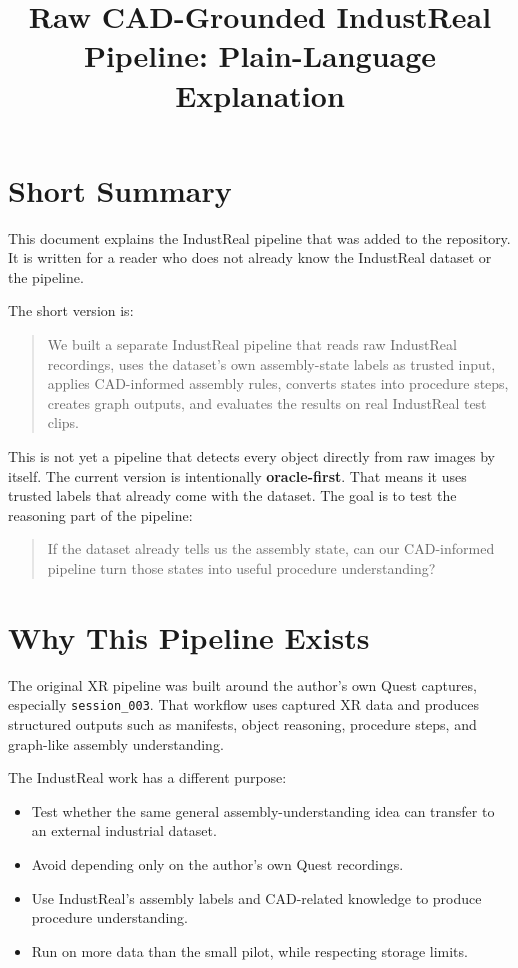 \documentclass[11pt,a4paper]{article}
\title{Raw CAD-Grounded IndustReal Pipeline: Plain-Language Explanation}
\author{}
\date{}
\begin{document}
\maketitle

\section*{Short Summary}

This document explains the IndustReal pipeline that was added to the repository. It is written for a reader who does not already know the IndustReal dataset or the pipeline.

The short version is:

\begin{quote}
We built a separate IndustReal pipeline that reads raw IndustReal recordings, uses the dataset's own assembly-state labels as trusted input, applies CAD-informed assembly rules, converts states into procedure steps, creates graph outputs, and evaluates the results on real IndustReal test clips.
\end{quote}

This is not yet a pipeline that detects every object directly from raw images by itself. The current version is intentionally \textbf{oracle-first}. That means it uses trusted labels that already come with the dataset. The goal is to test the reasoning part of the pipeline:

\begin{quote}
If the dataset already tells us the assembly state, can our CAD-informed pipeline turn those states into useful procedure understanding?
\end{quote}

\section{Why This Pipeline Exists}

The original XR pipeline was built around the author's own Quest captures, especially \texttt{session\_003}. That workflow uses captured XR data and produces structured outputs such as manifests, object reasoning, procedure steps, and graph-like assembly understanding.

The IndustReal work has a different purpose:

\begin{itemize}[leftmargin=*]
    \item Test whether the same general assembly-understanding idea can transfer to an external industrial dataset.
    \item Avoid depending only on the author's own Quest recordings.
    \item Use IndustReal's assembly labels and CAD-related knowledge to produce procedure understanding.
    \item Run on more data than the small pilot, while respecting storage limits.
\end{itemize}
\end{document}
